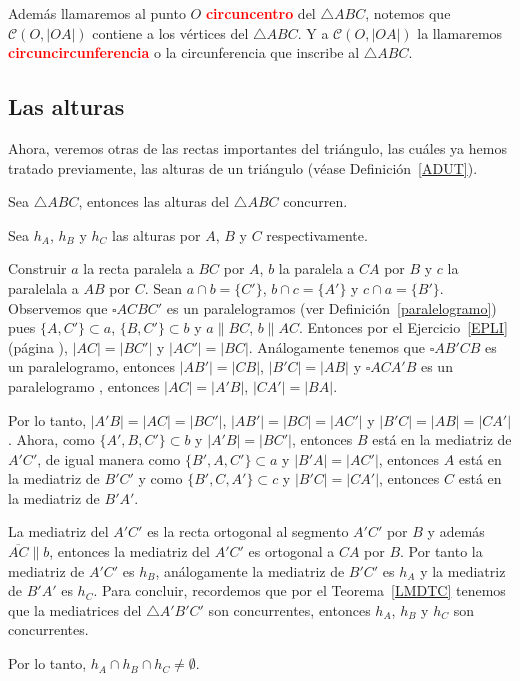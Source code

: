 Además llamaremos al punto $O$ \textcolor{red}{\bf circuncentro} del $\triangle ABC$, notemos que $\mathcal{C}(O,|OA|)$ contiene a los vértices del $\triangle ABC$. Y a $\mathcal{C}(O,|OA|)$ la llamaremos \textcolor{red}{\bf circuncircunferencia} o la circunferencia que inscribe al $\triangle ABC$. 
\subsection{Las alturas} 
Ahora, veremos otras de las rectas importantes del triángulo, las cuáles ya hemos tratado previamente, las alturas de un triángulo (véase Definición~\ref{ADUT}).

\begin{teo}
Sea $\triangle ABC$, entonces las alturas del $\triangle ABC$ concurren. 
\end{teo}
\begin{dem}
Sea $h_{A}$, $h_{B}$ y $h_{C}$ las alturas por $A$, $B$ y $C$ respectivamente. 

Construir $a$ la recta paralela  a $BC$ por $A$, $b$ la paralela a $CA$ por $B$ y $c$ la paralelala a $AB$ por $C$. Sean $a\cap b=\{C'\}$, $b\cap c=\{A'\}$ y  $c\cap a=\{B'\}$. 
Observemos que $\square ACBC'$ es un paralelogramos (ver Definición~\ref{paralelogramo}) pues $\{A,C'\}\subset a$, $\{B,C'\}\subset b$ y $a\parallel BC$, $b\parallel AC$. Entonces por el Ejercicio~\ref{EPLI}(página \pageref{EPLI}), $|AC|=|BC'|$ y $|AC'|=|BC|$. Análogamente tenemos que $\square AB'CB$ es un paralelogramo, entonces $|AB'|=|CB|$, $|B'C|=|AB|$ y $\square ACA'B$ es un paralelogramo , entonces $|AC|=|A'B|$, $|CA'|=|BA|$. 

Por lo tanto, $|A'B|=|AC|=|BC'|$, $|AB'|=|BC|=|AC'|$ y $|B'C|=|AB|=|CA'|$. Ahora, como $\{A',B,C'\}\subset b$ y $|A'B|=|BC'|$, entonces $B$ está en la mediatriz de $A'C'$, de igual manera como $\{B',A,C'\}\subset a$ y $|B'A|=|AC'|$, entonces $A$ está en la mediatriz de $B'C'$ y como $\{B',C,A'\}\subset c$ y $|B'C|=|CA'|$, entonces $C$ está en la mediatriz de $B'A'$. 

La mediatriz del $A'C'$ es la recta ortogonal al segmento $A'C'$ por $B$ y además $\overline{AC}\parallel b$, entonces la mediatriz del $A'C'$ es ortogonal a $CA$ por $B$. Por tanto la mediatriz de $A'C'$ es $h_{B}$, análogamente la mediatriz de $B'C'$ es $h_{A}$ y la mediatriz de $B'A'$ es $h_{C}$. 
Para concluir, recordemos que por el Teorema~\ref{LMDTC} tenemos que la mediatrices del $\triangle A'B'C'$ son concurrentes, entonces $h_{A}$, $h_{B}$ y $h_{C}$ son concurrentes. 

Por lo tanto,  $h_{A}\cap h_{B}\cap h_{C}\neq\emptyset$.
\end{dem}

